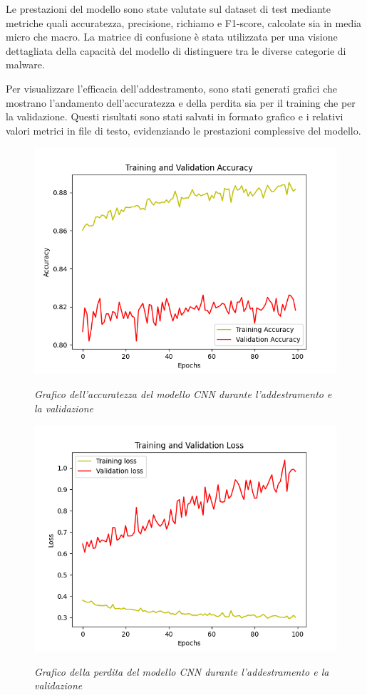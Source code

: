 Le prestazioni del modello sono state valutate sul dataset di test mediante metriche quali accuratezza, precisione, richiamo e F1-score, calcolate sia in media micro che macro. La matrice di confusione è stata utilizzata per una visione dettagliata della capacità del modello di distinguere tra le diverse categorie di malware.

Per visualizzare l'efficacia dell'addestramento, sono stati generati grafici che mostrano l'andamento dell'accuratezza e della perdita sia per il training che per la validazione. Questi risultati sono stati salvati in formato grafico e i relativi valori metrici in file di testo, evidenziando le prestazioni complessive del modello.

\newpage
\begin{figure}[ht]
    \centering
        \centering
        \includegraphics[width=0.7\linewidth]{images/cnn_accuracy.png}
        \label{fig:cnn_accuracy}
        \caption{\emph{Grafico dell'accuratezza del modello CNN durante l'addestramento e la validazione}}
\end{figure}

\begin{figure}[ht]
    \centering
        \centering
        \includegraphics[width=0.7\linewidth]{images/cnn_loss.png}
        \label{fig:cnn_loss}
        \caption{\emph{Grafico della perdita del modello CNN durante l'addestramento e la validazione}}
\end{figure}

